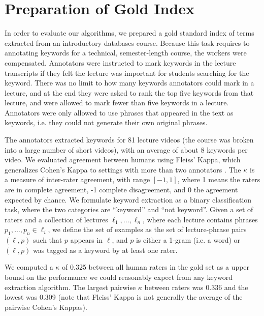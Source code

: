 \section{Preparation of Gold Index}
\label{sec:gold}


In order to evaluate our algorithms, we prepared a gold standard index of terms extracted from an introductory databases course. Because this task requires to annotating keywords for a technical, semester-length course, the workers were compensated. Annotators were instructed to mark keywords in the lecture transcripts if they felt the lecture was important for students searching for the keyword. There was no limit to how many keywords annotators could mark in a lecture, and at the end they were asked to rank the top five keywords from that lecture, and were allowed to mark fewer than five keywords in a lecture. Annotators were only allowed to use phrases that appeared in the text as keywords, i.e. they could not generate their own original phrases.

The annotators extracted keywords for 81 lecture videos (the course was broken into a large number of short videos), with an average of about 8 keywords per video. We evaluated agreement between humans using Fleiss' Kappa, which generalizes Cohen's Kappa to settings with more than two annotators \cite{fleiss1971measuring}. The $\kappa$ is a measure of inter-rater agreement, with range $[-1, 1]$, where 1 means the raters are in complete agreement, -1 complete disagreement, and 0 the agreement expected by chance. We formulate keyword extraction as a binary classification task, where the two categories are ``keyword'' and ``not keyword''. Given a set of raters and a collection of lectures $\ell_1, \ldots, \ell_n$, where each lecture contains phrases $p_1, \ldots, p_n \in \ell_i$, we define the set of examples as the set of lecture-phrase pairs $(\ell, p)$ such that $p$ appears in $\ell$, and $p$ is either a 1-gram (i.e. a word) or $(\ell, p)$ was tagged as a keyword by at least one rater.

We computed a $\kappa$ of 0.325 between all human raters in the gold set as a upper bound on the performance we could reasonably expect from any keyword extraction algorithm. The largest pairwise $\kappa$ between raters was 0.336 and the lowest was 0.309 (note that Fleiss' Kappa is not generally the average of the pairwise Cohen's Kappas).
